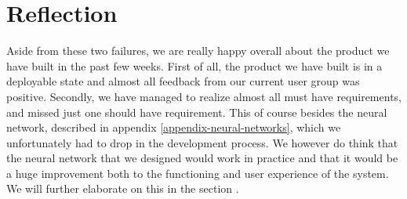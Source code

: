 \section{Reflection}
Aside from these two failures, we are really happy overall about the product we have built in the past few weeks.
First of all, the product we have built is in a deployable state and almost all feedback from our current user group was positive.
Secondly, we have managed to realize almost all must have requirements, and missed just one should have requirement.
This of course besides the neural network, described in appendix \ref{appendix-neural-networks}, which we unfortunately had to drop in the development process.
We however do think that the neural network that we designed would work in practice and that it would be a huge improvement both to the functioning and user experience of the system.
We will further elaborate on this in the section .

